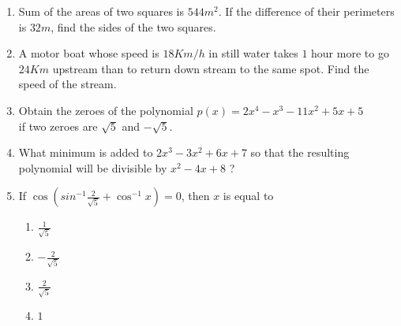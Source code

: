 \documentclass[12pt]{article}
\providecommand{\brak}[1]{\ensuremath{\left(#1\right)}}
\begin{document}
\begin{enumerate}
\item
	Sum of the areas of two squares is $544 m^2$. If the difference of their
perimeters is $32 m$, find the sides of the two squares.

\item
	A motor boat whose speed is $18 Km/h$ in still water takes $1$ hour more to 
go $24 Km$ upstream than to return down stream to the same spot. Find the speed of the stream.

\item 
	Obtain the zeroes of the polynomial
$p(x) = 2x^4 - x^3 - 11x^2 + 5x + 5$ \\
if two zeroes are $\sqrt5$ and $-\sqrt5$.

\item
	What minimum is added to $2x^3 - 3x^2 + 6x + 7$ so that the resulting
polynomial will be divisible by $x^2 - 4x + 8$ ?

\item
	If $\cos\brak{sin^{-1}\frac{2}{\sqrt{5}} + \cos^{-1}x} = 0$, then $x$ is equal to
\begin{enumerate}[label=(\Alph*)]
	\item $\frac{1}{\sqrt{5}}$
	\item $-\frac{2}{\sqrt{5}}$
	\item $\frac{2}{\sqrt{5}}$
        \item $1$
\end{enumerate}
\end{enumerate}

	
\end{document}
